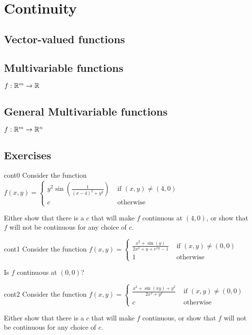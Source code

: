 \section{Continuity}\label{sec:continuity}

\subsection{Vector-valued functions}

\subsection{Multivariable functions}

$f : \mathbb{R}^m\to \mathbb{R}$

\subsection{General Multivariable functions}

$f : \mathbb{R}^m \to \mathbb{R}^n$


\subsection{Exercises}

\begin{problem}{cont0}
Consider the function  $f(x,y) = \left\{
		\begin{array}{ll}
			y^2\sin(\frac{1}{(x-4)^2 + y^2}) & \text{ if } (x,y) \neq (4,0) \\
			c & \text{ otherwise } 
		\end{array}
		\right.$
		
		Either show that there is a $c$ that will make $f$ continuous at $(4,0)$, or show that $f$ will not be continuous for any choice of $c$.
\end{problem}

\begin{problem}{cont1}
Consider the function $f(x,y) = \left\{
		\begin{array}{ll}
			\frac{x^2 + \sin(y)}{2x^2 + y +e^{xy}-1} & \text{ if } (x,y) \neq (0,0) \\
			1 & \text{ otherwise } 
		\end{array}
		\right.$
		
		Is $f$ continuous at $(0,0)$?
\end{problem}



\begin{problem}{cont2}
Consider the function  $f(x,y) = \left\{
		\begin{array}{ll}
			\frac{x^2  +\sin(xy)+y^2}{2x^2 + y^2} & \text{ if } (x,y) \neq (0,0) \\
			c & \text{ otherwise } 
		\end{array}
		\right.$
		
		Either show that there is a $c$ that will make $f$ continuous, or show that $f$ will not be continuous for any choice of $c$.
\end{problem}

